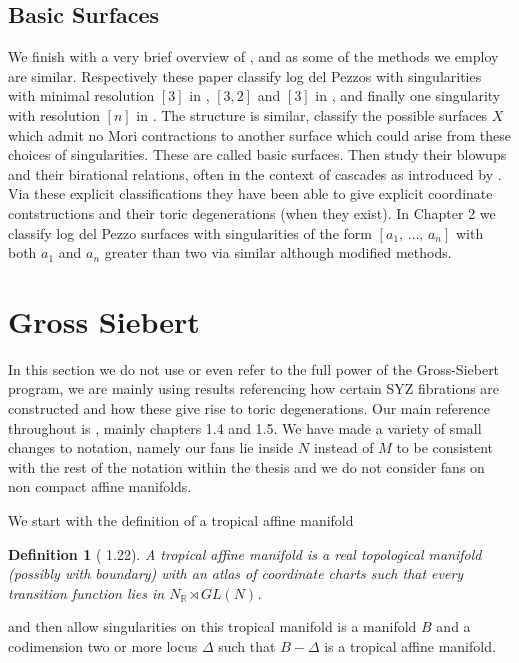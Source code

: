 \documentclass[12pt,a4paper]{book}      %
\newtheorem{dfn}[thm]{Definition}
\newcommand{\mb}[1]{\mathbb{#1}}
\begin{document}
\subsection{Basic Surfaces}
We finish with a very brief overview of \cite{CortiHeu}, \cite{Cuzzucoli} and \cite{CaveyPrince} as some of the methods we employ are similar. Respectively these paper classify log del Pezzos with singularities with minimal resolution $[3]$ in \cite{CortiHeu}, $[3,2]$ and $[3]$ in \cite{Cuzzucoli}, and finally one singularity with resolution $[n]$ in \cite{CaveyPrince}. The structure is similar, classify the possible surfaces $X$ which admit no Mori contractions to another surface which could arise from these choices of singularities. These are called basic surfaces. Then study their blowups and their birational relations, often in the context of cascades as introduced by \cite{ReidSuzuki}. Via these explicit classifications they have been able to give explicit coordinate contstructions and their toric degenerations (when they exist). In Chapter 2 we classify log del Pezzo surfaces with singularities of the form $[a_1, \, \dots ,   \, a_n]$ with both $a_1$ and $a_n$ greater than two via similar although modified methods.


\section{Gross Siebert}

In this section we do not use or even refer to the full power of the Gross-Siebert program, we are mainly using results referencing how certain SYZ fibrations are constructed and how these give rise to toric degenerations. Our main reference throughout is \cite{GrossBook}, mainly chapters 1.4 and 1.5. We have made a variety of small changes to notation, namely our fans lie inside $N$ instead of $M$ to be consistent with the rest of the notation within the thesis and we do not consider fans on non compact affine manifolds.

We start with the definition of a tropical affine manifold
\begin{dfn}[\cite{GrossBook} 1.22]
A tropical affine manifold is a real topological manifold (possibly with boundary) with an atlas of coordinate charts such that every transition function lies in $N_\mb{R} \rtimes GL(N)$.
\end{dfn}
and then allow singularities on this tropical manifold is a manifold $B$ and a codimension two or more locus $\Delta$ such that $B-\Delta$ is a tropical affine manifold.
\end{document}
